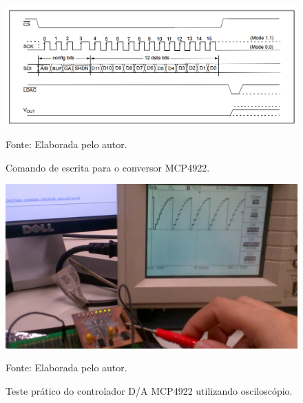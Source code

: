 \begin{figure}[!htb]
	\centering
	\caption{Comando de escrita para o conversor MCP4922.}
	\includegraphics[scale = .5]{Imagens/WriteCommandMCP4922}
	
	Fonte: Elaborada pelo autor.
	
	\label{WriteCommandMCP4922}
\end{figure}

\begin{figure}[!htb]
	\centering
	\caption{Teste prático do controlador D/A MCP4922 utilizando osciloscópio.}
	\includegraphics[scale = .7, angle = 90]{Imagens/teste_conversor_DAC}
	
	Fonte: Elaborada pelo autor.
	
	\label{teste_conversor_DAC}
\end{figure}

